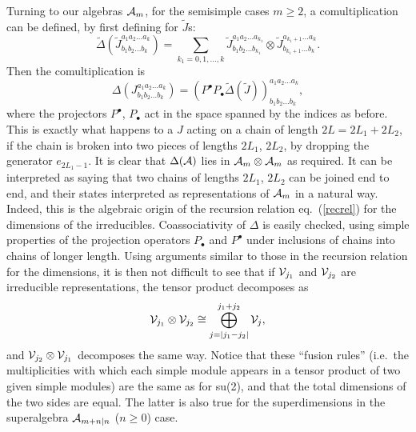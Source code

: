 \documentclass[twocolumn,floats,pra]{revtex4}
\def \cA {{\cal A}}
\newcommand {\be}{\begin{equation}}
\newcommand {\ee} {\end{equation}}
\begin{document}
Turning to our algebras ${\cal A}_m$, for the semisimple cases
$m\geq 2$, a comultiplication can be defined, by first defining
for
$\widetilde{J}$s:%
\be%
\widetilde{\Delta}(\widetilde{J}^{a_1a_2\ldots a_k}_{b_1b_2\ldots
b_k})= \sum_{k_1=0,1,\ldots,k}\widetilde{J}^{a_1a_2\ldots
a_{k_1}}_{b_1b_2\ldots b_{k_1}}
\otimes\widetilde{J}^{a_{k_1+1}\ldots
a_k}_{b_{k_1+1}\ldots b_k}.\ee%
Then the comultiplication is%
\be%
\Delta(J^{a_1a_2\ldots a_k}_{b_1b_2\ldots b_k})=(P^\bullet
P_\bullet\widetilde{\Delta}(\widetilde{J}))^{a_1a_2\ldots
a_k}_{b_1b_2\ldots b_k},\ee%
where the projectors $P^\bullet$, $P_\bullet$ act in the space
spanned by the indices as before. This is exactly what happens to
a $J$ acting on a chain of length $2L=2L_1+2L_2$, if the chain is
broken into two pieces of lengths $2L_1$, $2L_2$, by dropping the
generator $e_{2L_1-1}$. It is clear that $\Delta(\cA)$ lies in
$\cA_m\otimes\cA_m$ as required. It can be interpreted as saying
that two chains of lengths $2L_1$, $2L_2$ can be joined end to
end, and their states interpreted as representations of $\cA_m$ in
a natural way. Indeed, this is the algebraic origin of the
recursion relation eq.\ (\ref{recrel}) for the dimensions of the
irreducibles. Coassociativity of $\Delta$ is easily checked, using
simple properties of the projection operators $P_\bullet$ and
$P^\bullet$ under inclusions of chains into chains of longer
length. Using arguments similar to those in the recursion relation
for the dimensions, it is then not difficult to see that if ${\cal
V}_{j_1}$ and ${\cal V}_{j_2}$ are irreducible representations,
the tensor product decomposes as %
\be%
{\cal V}_{j_1}\otimes{\cal
V}_{j_2}\cong\bigoplus_{j=|j_1-j_2|}^{j_1+j_2}{\cal V}_j,
\label{fusrul}\ee%
and ${\cal V}_{j_2}\otimes{\cal V}_{j_1}$ decomposes the same way.
Notice that these ``fusion rules'' (i.e.\ the multiplicities with
which each simple module appears in a tensor product of two given
simple modules) are the same as for su(2), and that the total
dimensions of the two sides are equal. The latter is also true for
the superdimensions in the superalgebra $\cA_{m+n|n}$ ($n\geq 0$)
case.
\end{document}
